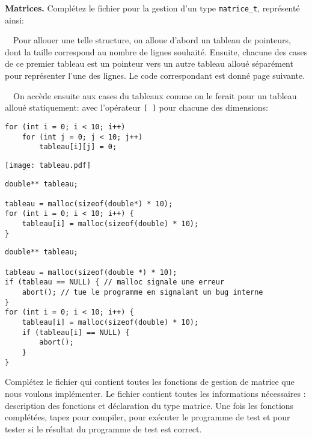 \documentclass[10pt]{article}\usepackage[enonce]{exemptty}
\begin{document}
\begin{Exercice} \textbf{Matrices.}  Complétez le fichier
   pour la gestion d'un type \texttt{matrice\_t},
  représenté ainsi:
  
  \smallskip\noindent
  \begin{minipage}{.5\linewidth}%

    ~~Pour allouer une telle structure, on alloue d'abord un tableau de
    pointeurs, dont la taille correspond au nombre de lignes
    souhaité. Ensuite, chacune des cases de ce premier tableau est un
    pointeur vers un autre tableau alloué séparément pour représenter
    l'une des lignes. Le code correspondant est donné page suivante.

    \smallskip
    ~~On accède ensuite aux cases du tableaux comme on le ferait pour un
    tableau alloué statiquement: avec l'opérateur \verb~[ ]~ pour
    chacune des dimensions:

\begin{Verbatim}[label=Initialisation des éléments,numbers=right]    
for (int i = 0; i < 10; i++)
    for (int j = 0; j < 10; j++)
        tableau[i][j] = 0;
\end{Verbatim}


\end{minipage}\hfill\begin{minipage}{.48\linewidth}
  \texttt{[image: tableau.pdf]}
\end{minipage}
  
\begin{Verbatim}[label=Allocation d'un tableau de 10*10 doubles]
double** tableau;

tableau = malloc(sizeof(double*) * 10);
for (int i = 0; i < 10; i++) {
    tableau[i] = malloc(sizeof(double) * 10);
}
\end{Verbatim}

\begin{Verbatim}[label=Idem avec gestion des erreurs]
double** tableau;

tableau = malloc(sizeof(double *) * 10);
if (tableau == NULL) { // malloc signale une erreur
    abort(); // tue le programme en signalant un bug interne
}
for (int i = 0; i < 10; i++) {
    tableau[i] = malloc(sizeof(double) * 10);
    if (tableau[i] == NULL) {
        abort();
    }
}
\end{Verbatim}


  \Question Complétez le fichier  qui contient toutes les
  fonctions de gestion de matrice que nous voulons implémenter. Le fichier
   contient toutes les informations nécessaires : description
  des fonctions et déclaration du type matrice. Une fois les fonctions
  complétées, tapez  pour compiler,
   pour exécuter le programme de test et  pour tester si le résultat du programme de test est correct.
\end{Exercice}
\end{document}
